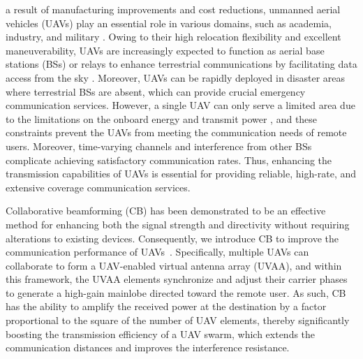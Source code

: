 \documentclass[10pt,journal,compsoc]{IEEEtran}
\begin{document}
 a result of manufacturing improvements and cost reductions, unmanned aerial vehicles (UAVs) play an essential role in various domains, such as academia, industry, and military \cite{Sun2024}. Owing to their high relocation flexibility and excellent maneuverability, UAVs are increasingly expected to function as aerial base stations (BSs) or relays to enhance terrestrial communications by facilitating data access from the sky \cite{liang2024multiobjective,Zhang2024}. Moreover, UAVs can be rapidly deployed in disaster areas where terrestrial BSs are absent, which can provide crucial emergency communication services. However, a single UAV can only serve a limited area due to the limitations on the onboard energy and transmit power \cite{zeng2019accessing}, and these constraints prevent the UAVs from meeting the communication needs of remote users. Moreover, time-varying channels and interference from other BSs complicate achieving satisfactory communication rates. Thus, enhancing the transmission capabilities of UAVs is essential for providing reliable, high-rate, and extensive coverage communication services.

\par Collaborative beamforming (CB) has been demonstrated to be an effective method for enhancing both the signal strength and directivity without requiring alterations to existing devices. Consequently, we introduce CB to improve the communication performance of UAVs~\cite{jayaprakasam2017}. Specifically, multiple UAVs can collaborate to form a UAV-enabled virtual antenna array (UVAA), and within this framework, the UVAA elements synchronize and adjust their carrier phases to generate a high-gain mainlobe directed toward the remote user. As such, CB has the ability to amplify the received power at the destination by a factor proportional to the square of the number of UAV elements, thereby significantly boosting the transmission efficiency of a UAV swarm, which extends the communication distances and improves the interference resistance. 
\end{document}
